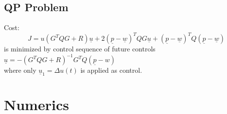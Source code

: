 \documentclass[english]{latex4ei/latex4ei_sheet}
\begin{document}
\begin{sectionbox}
\subsection{QP Problem}
Cost: $$J=u\left(G^{T} Q G+R\right) \underline{u}+2(\underline{p}-\underline{w})^{T} Q G \underline{u}+(\underline{p}-\underline{w})^{T} Q(\underline{p}-\underline{w})$$ is minimized by control sequence of future controls \\
$\underline{u}=-\left(G^{T} Q G+R\right)^{-1} G^{T} Q(\underline{p}-w)$\\
where only $\underline{u}_{1}=\Delta u(t)$ is applied as control.

\end{sectionbox}


\section{Numerics}
\end{document}
